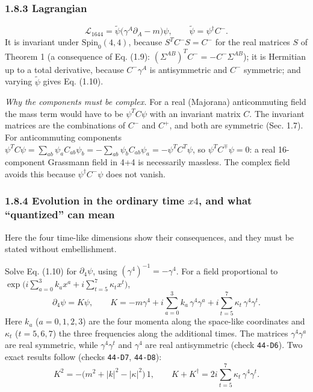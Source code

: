 \documentclass[
  10pt,
]{article}
\begin{document}
\hypertarget{lagrangian}{%
\subsubsection{1.8.3 Lagrangian}\label{lagrangian}}

\[\mathcal{L}_{1644}=\tilde\psi\big(\gamma^A\partial_A-m\big)\psi,\qquad\tilde\psi=\psi^\dagger C^{-} .\tag{1.14}\]
It is invariant under \(\mathrm{Spin}_0(4,4)\), because
\(S^TC^{-}S=C^{-}\) for the real matrices \(S\) of Theorem 1 (a
consequence of Eq. (1.9): \((\Sigma^{AB})^TC^{-}=-C^{-}\Sigma^{AB}\));
it is Hermitian up to a total derivative, because \(C^{-}\gamma^A\) is
antisymmetric and \(C^{-}\) symmetric; and varying \(\tilde\psi\) gives
Eq. (1.10).

\emph{Why the components must be complex.} For a real (Majorana)
anticommuting field the mass term would have to be \(\psi^TC\psi\) with
an invariant matrix \(C\). The invariant matrices are the combinations
of \(C^{-}\) and \(C^{+}\), and both are symmetric (Sec. 1.7). For
anticommuting components
\(\psi^TC\psi=\sum_{ab}\psi_aC_{ab}\psi_b=-\sum_{ab}\psi_bC_{ab}\psi_a=-\psi^TC^T\psi\),
so \(\psi^TC^{\mp}\psi=0\): a real 16-component Grassmann field in 4+4
is necessarily massless. The complex field avoids this because
\(\psi^\dagger C^{-}\psi\) does not vanish.

\hypertarget{evolution-in-the-ordinary-time-x4-and-what-quantized-can-mean}{%
\subsubsection{\texorpdfstring{1.8.4 Evolution in the ordinary time
\(x4\), and what ``quantized'' can
mean}{1.8.4 Evolution in the ordinary time x4, and what ``quantized'' can mean}}\label{evolution-in-the-ordinary-time-x4-and-what-quantized-can-mean}}

Here the four time-like dimensions show their consequences, and they
must be stated without embellishment.

Solve Eq. (1.10) for \(\partial_4\psi\), using
\((\gamma^4)^{-1}=-\gamma^4\). For a field proportional to
\(\exp\!\big(i\sum_{a=0}^3k_ax^a+i\sum_{t=5}^7\kappa_tx^t\big)\),
\[\partial_4\psi=K\psi,\qquad K=-m\gamma^4+i\sum_{a=0}^{3}k_a\,\gamma^4\gamma^a+i\sum_{t=5}^{7}\kappa_t\,\gamma^4\gamma^t .\tag{1.15}\]
Here \(k_a\) (\(a=0,1,2,3\)) are the four momenta along the space-like
coordinates and \(\kappa_t\) (\(t=5,6,7\)) the three frequencies along
the additional times. The matrices \(\gamma^4\gamma^a\) are real
symmetric, while \(\gamma^4\gamma^t\) and \(\gamma^4\) are real
antisymmetric (check \texttt{44-D6}). Two exact results follow (checks
\texttt{44-D7}, \texttt{44-D8}):
\[K^2=-\big(m^2+|k|^2-|\kappa|^2\big)\,1,\qquad K+K^\dagger=2i\sum_{t=5}^{7}\kappa_t\,\gamma^4\gamma^t .\tag{1.16}\]
\end{document}

